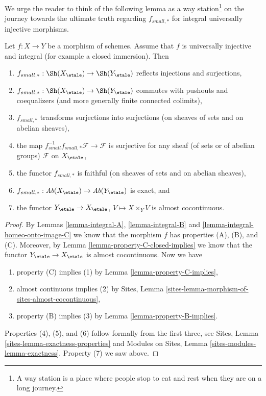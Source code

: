 \noindent
We urge the reader to think of the following lemma as a
way station\footnote{A way station is a place where people stop to eat
and rest when they are on a long journey.} on the journey towards the
ultimate truth regarding $f_{small, *}$ for integral universally injective
morphisms.

\begin{lemma}
\label{lemma-integral-universally-injective}
Let $f : X \to Y$ be a morphism of schemes. Assume that $f$ is
universally injective and integral (for example a closed immersion).
Then
\begin{enumerate}
\item
$f_{small, *} :
\Sh(X_\etale)
\to
\Sh(Y_\etale)$
reflects injections and surjections,
\item
$f_{small, *} :
\Sh(X_\etale)
\to
\Sh(Y_\etale)$
commutes with pushouts and coequalizers (and more generally
finite connected colimits),
\item $f_{small, *}$ transforms surjections into surjections (on sheaves
of sets and on abelian sheaves),
\item the map
$f_{small}^{-1}f_{small, *}\mathcal{F} \to \mathcal{F}$
is surjective for any sheaf (of sets or of abelian groups)
$\mathcal{F}$ on $X_\etale$,
\item the functor $f_{small, *}$ is faithful (on sheaves of sets and
on abelian sheaves),
\item
$f_{small, *} :
\textit{Ab}(X_\etale)
\to
\textit{Ab}(Y_\etale)$
is exact, and
\item the functor
$Y_\etale \to X_\etale$, $V \mapsto X \times_Y V$ is
almost cocontinuous.
\end{enumerate}
\end{lemma}

\begin{proof}
By
Lemmas \ref{lemma-integral-A},
\ref{lemma-integral-B} and
\ref{lemma-integral-homeo-onto-image-C}
we know that the morphism $f$ has properties (A), (B), and (C).
Moreover, by
Lemma \ref{lemma-property-C-closed-implies}
we know that the functor $Y_\etale \to X_\etale$ is
almost cocontinuous. Now we have
\begin{enumerate}
\item property (C) implies (1) by
Lemma \ref{lemma-property-C-implies},
\item almost continuous implies (2) by
Sites, Lemma \ref{sites-lemma-morphism-of-sites-almost-cocontinuous},
\item property (B) implies (3) by
Lemma \ref{lemma-property-B-implies}.
\end{enumerate}
Properties (4), (5), and (6) follow formally from the first three, see
Sites, Lemma \ref{sites-lemma-exactness-properties}
and
Modules on Sites, Lemma \ref{sites-modules-lemma-exactness}.
Property (7) we saw above.
\end{proof}




